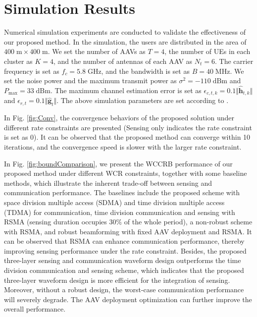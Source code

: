 \documentclass[twocolumn,journal]{IEEEtran}
\begin{document}
\section{Simulation Results}
Numerical simulation experiments are conducted to validate the effectiveness of our proposed method. In the simulation, the users are distributed in the area of \(400\;\text{m}\times 400\;\text{m}\). We set the number of AAVs as \(T=4\), the number of UEs in each cluster as \(K=4\), and the number of antennas of each AAV as \(N_t=6\). 
The carrier frequency is set as \(f_c=5.8\;\text{GHz}\), and the bandwidth is set as \(B=40\;\text{MHz}\). We set the noise power and the maximum transmit power as \(\sigma^2=-110\;\text{dBm}\) and \(P_{\max}=33\;\text{dBm}\). The maximum channel estimation error is set as \(\epsilon_{c,t,k}=0.1\Vert \hat{\boldsymbol{h}}_{t,k} \Vert\) and \(\epsilon_{r,t}=0.1\Vert \hat{\boldsymbol{g}}_{t} \Vert\). The above simulation parameters are set according to \cite{huCollaborative2025,mengUAVEnabled2023,lyuDualRobust2024}.

In Fig. \ref{fig:Conv}, the convergence behaviors of the proposed solution under different rate constraints are presented (Sensing only indicates the rate constraint is set as \(0\)). It can be observed that the proposed method can converge within 10 iterations, and the convergence speed is slower with the larger rate constraint. 

In Fig. \ref{fig:boundComparison}, we present the WCCRB performance of our proposed method under different WCR constraints, together with some baseline methods, which illustrate the inherent trade-off between sensing and communication performance. The baselines include the proposed scheme with space division multiple access (SDMA) and time division multiple access (TDMA) for communication, time division communication and sensing with RSMA (sensing duration occupies \(30\%\) of the whole period), a non-robust scheme with RSMA, and robust beamforming with fixed AAV deployment and RSMA.
It can be observed that RSMA can enhance communication performance, thereby improving sensing performance under the rate constraint. Besides, the proposed three-layer sensing and communication waveform design outperforms the time division communication and sensing scheme, which indicates that the proposed three-layer waveform design is more efficient for the integration of sensing. Moreover, without a robust design, the worst-case communication performance will severely degrade. The AAV deployment optimization can further improve the overall performance.
\end{document}

